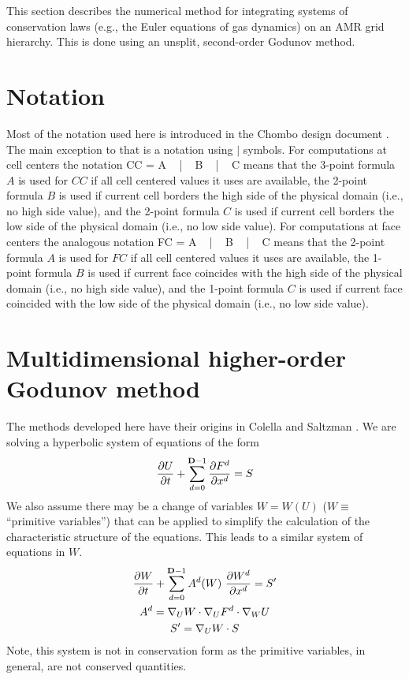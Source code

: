 This section describes the numerical method for integrating systems of
conservation laws (e.g., the Euler equations of gas dynamics) on
an AMR grid hierarchy.  This is done using an unsplit, second-order Godunov
method.

\section{Notation}

Most of the notation used here is introduced in the Chombo design document
\cite{ChomboDesign}.  The main exception to that is a notation using $|$
symbols.  For computations at cell centers the notation
\beqa
CC = A ~ | ~ B ~ | ~ C
\eeqa
means that
the 3-point formula $A$ is used for $CC$ if all cell centered values it uses
are available,
the 2-point formula $B$ is used if current cell borders the high side
of the physical domain (i.e., no high side value), and
the 2-point formula $C$ is used if current cell borders the low side
of the physical domain (i.e., no low side value).
For computations at face centers the analogous notation
\beqa
FC = A ~ | ~ B ~ | ~ C
\eeqa
means that
the 2-point formula $A$ is used for $FC$ if all cell centered values it uses
are available,
the 1-point formula $B$ is used if current face coincides with the high side
of the physical domain (i.e., no high side value), and
the 1-point formula $C$ is used if current face coincided with the low side
of the physical domain (i.e., no low side value).

\section{Multidimensional higher-order Godunov method
\label{sec:algorithm}}

The methods developed here have their origins in Colella \cite{COLELLA1} and
Saltzman \cite{Saltzman1}.
We are solving a hyperbolic system of equations of the form
\begin{gather}
\frac{\partial U}{\partial t}
+ \sum^{{\mathbf{D}}-1}_{d=0} \frac{\partial F^d}{\partial x^d}
= S
\label{eqn:hyperCons}
\end{gather}
We also assume there may be a change of variables $W = W(U)$ ($W \equiv
$ ``primitive variables'') that can be applied to simplify the
calculation of the characteristic structure of the equations.
This leads to a similar system of equations in $W$.
\begin{gather}
\frac{\partial W}{\partial t}
+ \sum^{{\mathbf{D}}-1}_{d=0} A^d(W) ~ \frac{\partial W^d}{\partial x^d}
= S' \\
A^d = \nabla_U W \cdot \nabla_U F^d \cdot \nabla_W U \notag \\
S' = \nabla_U W \cdot S \notag
\label{eqn:hyperPrim}
\end{gather}
Note, this system is not in conservation form as the primitive variables, in
general, are not conserved quantities.

